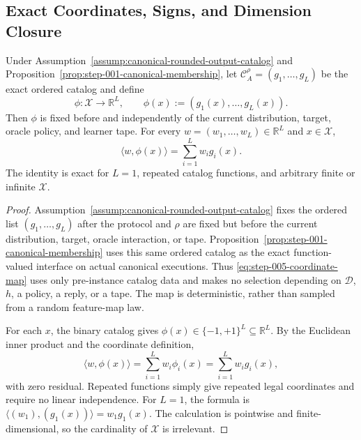 \subsection{Exact Coordinates, Signs, and Dimension Closure}
\label{app:step-005}

\begin{lemma}
\label{lem:step-005-coordinate-map}
Under Assumption~\ref{assump:canonical-rounded-output-catalog} and
Proposition~\ref{prop:step-001-canonical-membership}, let
\(\mathcal C_A^{\rho}=(g_1,\ldots,g_L)\) be the exact ordered catalog and
define
\begin{equation}
\phi:\mathcal X\to\mathbb R^L,
\qquad
\phi(x):=(g_1(x),\ldots,g_L(x)).
\label{eq:step-005-coordinate-map}
\end{equation}
Then \(\phi\) is fixed before and independently of the current distribution,
target, oracle policy, and learner tape.  For every
\(w=(w_1,\ldots,w_L)\in\mathbb R^L\) and \(x\in\mathcal X\),
\begin{equation}
\langle w,\phi(x)\rangle
=\sum_{i=1}^Lw_i g_i(x).
\label{eq:step-005-coordinate-identity}
\end{equation}
The identity is exact for \(L=1\), repeated catalog functions, and arbitrary
finite or infinite \(\mathcal X\).
\end{lemma}

\begin{proof}
Assumption~\ref{assump:canonical-rounded-output-catalog} fixes the ordered
list \((g_1,\ldots,g_L)\) after the protocol and \(\rho\) are fixed but
before the current distribution, target, oracle interaction, or tape.
Proposition~\ref{prop:step-001-canonical-membership} uses this same ordered
catalog as the exact function-valued interface on actual canonical
executions.  Thus \eqref{eq:step-005-coordinate-map} uses only pre-instance
catalog data and makes no selection depending on \(\mathcal D\), \(h\), a
policy, a reply, or a tape.  The map is deterministic, rather than sampled
from a random feature-map law.

For each \(x\), the binary catalog gives
\(\phi(x)\in\{-1,+1\}^L\subseteq\mathbb R^L\).  By the Euclidean inner
product and the coordinate definition,
\[
\langle w,\phi(x)\rangle
=\sum_{i=1}^Lw_i\phi_i(x)
=\sum_{i=1}^Lw_i g_i(x),
\]
with zero residual.  Repeated functions simply give repeated legal
coordinates and require no linear independence.  For \(L=1\), the formula
is \(\langle(w_1),(g_1(x))\rangle=w_1g_1(x)\).  The calculation is pointwise
and finite-dimensional, so the cardinality of \(\mathcal X\) is irrelevant.
\end{proof}

